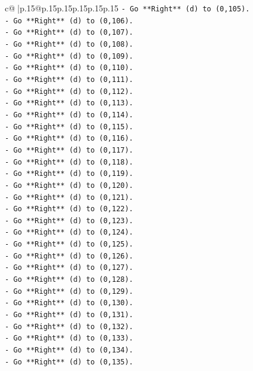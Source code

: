 \documentclass{article}
\begin{document}
{\begin{supertabular}{c@{$\;$}|p{.15\linewidth}@{}p{.15\linewidth}p{.15\linewidth}p{.15\linewidth}p{.15\linewidth}p{.15\linewidth}}
{{{\texttt{{-} Go **Right** (d) to (0,105).} \\
\texttt{{-} Go **Right** (d) to (0,106).} \\
\texttt{{-} Go **Right** (d) to (0,107).} \\
\texttt{{-} Go **Right** (d) to (0,108).} \\
\texttt{{-} Go **Right** (d) to (0,109).} \\
\texttt{{-} Go **Right** (d) to (0,110).} \\
\texttt{{-} Go **Right** (d) to (0,111).} \\
\texttt{{-} Go **Right** (d) to (0,112).} \\
\texttt{{-} Go **Right** (d) to (0,113).} \\
\texttt{{-} Go **Right** (d) to (0,114).} \\
\texttt{{-} Go **Right** (d) to (0,115).} \\
\texttt{{-} Go **Right** (d) to (0,116).} \\
\texttt{{-} Go **Right** (d) to (0,117).} \\
\texttt{{-} Go **Right** (d) to (0,118).} \\
\texttt{{-} Go **Right** (d) to (0,119).} \\
\texttt{{-} Go **Right** (d) to (0,120).} \\
\texttt{{-} Go **Right** (d) to (0,121).} \\
\texttt{{-} Go **Right** (d) to (0,122).} \\
\texttt{{-} Go **Right** (d) to (0,123).} \\
\texttt{{-} Go **Right** (d) to (0,124).} \\
\texttt{{-} Go **Right** (d) to (0,125).} \\
\texttt{{-} Go **Right** (d) to (0,126).} \\
\texttt{{-} Go **Right** (d) to (0,127).} \\
\texttt{{-} Go **Right** (d) to (0,128).} \\
\texttt{{-} Go **Right** (d) to (0,129).} \\
\texttt{{-} Go **Right** (d) to (0,130).} \\
\texttt{{-} Go **Right** (d) to (0,131).} \\
\texttt{{-} Go **Right** (d) to (0,132).} \\
\texttt{{-} Go **Right** (d) to (0,133).} \\
\texttt{{-} Go **Right** (d) to (0,134).} \\
\texttt{{-} Go **Right** (d) to (0,135).} \\
}}}
\end{supertabular}}
\end{document}
